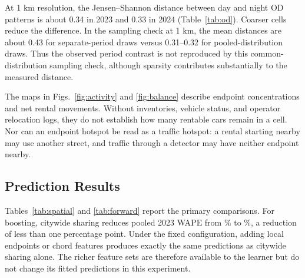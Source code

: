 \documentclass{interact}
\begin{document}
At 1 km resolution, the Jensen--Shannon distance between day and night OD patterns is about 0.34 in 2023 and 0.33 in 2024 (Table~\ref{tab:od}). Coarser cells reduce the difference. In the sampling check at 1 km, the mean distances are about 0.43 for separate-period draws versus 0.31--0.32 for pooled-distribution draws. Thus the observed period contrast is not reproduced by this common-distribution sampling check, although sparsity contributes substantially to the measured distance.

The maps in Figs.~\ref{fig:activity} and \ref{fig:balance} describe endpoint concentrations and net rental movements. Without inventories, vehicle status, and operator relocation logs, they do not establish how many rentable cars remain in a cell. Nor can an endpoint hotspot be read as a traffic hotspot: a rental starting nearby may use another street, and traffic through a detector may have neither endpoint nearby.

\subsection{Prediction Results}
\label{sec:prediction-results}
Tables~\ref{tab:spatial} and \ref{tab:forward} report the primary comparisons. For boosting, citywide sharing reduces pooled 2023 WAPE from \SpatialBoostBasePooled\%{} to \SpatialBoostGlobalPooled\%{}, a reduction of less than one percentage point. Under the fixed configuration, adding local endpoints or chord features produces exactly the same predictions as citywide sharing alone. The richer feature sets are therefore available to the learner but do not change its fitted predictions in this experiment.

\begin{table}[t]
\caption{Buffered spatial test in 2023. WAPE in percent. Macro averages device errors; pooled weights by detections; cluster averages after pooling within spatial components. Very large macro values are retained, not typographical errors.}
\label{tab:spatial}\centering\scriptsize

\end{table}
\begin{table}[t]
\caption{Excluded-device test in 2024 with the 2023 models unchanged. WAPE in percent, with the same definitions as Table~\ref{tab:spatial}. Test sharing and weather are contemporaneously observed.}
\label{tab:forward}\centering\scriptsize

\end{table}
\end{document}
